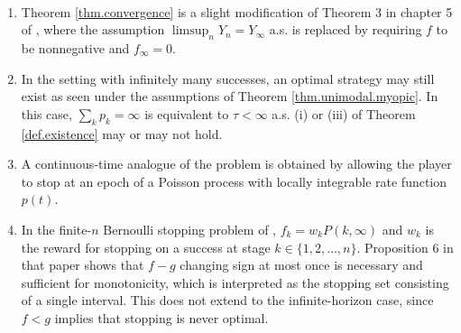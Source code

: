 \documentclass[11pt]{article}
\begin{document}
%
%	
%	
\begin{rem}
	$ $
	\begin{enumerate}[label=\rm(\roman*)]
		\item 	Theorem \ref {thm.convergence} is a slight modification of Theorem 3 in chapter 5 of \cite{FergusonBook}, where the assumption $\limsup_n Y_n = Y_\infty$ a.s. is replaced by requiring  $f$  to be nonnegative and $f_\infty=0$.
		
		\item In the setting with infinitely many successes, an optimal strategy may still exist as seen under the assumptions of Theorem \ref{thm.unimodal.myopic}.  In this case, $\sum_k p_k = \infty$ is equivalent to $\tau<\infty$ a.s. \rm(i) or \rm(iii) of Theorem  \ref{def.existence} may or may not hold. 

		\item A continuous-time analogue of the problem is obtained by allowing  the player to stop at an epoch of a Poisson process with locally integrable rate function $p(t)$.
		
		\item In the finite-$n$ Bernoulli stopping problem of \cite{Ribas2019}, $f_k=w_kP(k,\infty)$ and \( w_k \) is the reward for stopping on a success at stage \( k \in \{ 1, 2, \ldots, n\} \). Proposition 6 in that paper shows that  $f-g$ changing sign at most once is necessary and sufficient for monotonicity, which is interpreted  as the stopping set consisting of a single interval. This does not extend to the infinite-horizon case, since  \( f < g \) implies that stopping is never optimal.
	\end{enumerate}
\end{rem}
\end{document}
